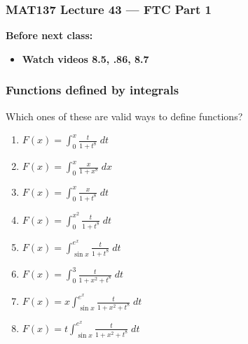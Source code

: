 \documentclass[14pt]{beamer}
\newcommand{\setsize}[1]{\fontsize{#1}{#1}\selectfont} %
\newcommand{\vv}{\vspace{.1cm}}
\begin{document}
\begin{frame}
	\frametitle{MAT137 Lecture 43 --- FTC Part 1}

	\vfill
	{\bf Before next class:}
		\begin{itemize} \normalsize
			\item {\bf Watch videos 8.5, .86, 8.7}
		\end{itemize}
\end{frame}
	\begin{frame}[t]
		\setsize{11}
		\frametitle{Functions defined by integrals}

		Which ones of these are valid ways to define functions?

		\vv

		\begin{multicols}{2}
			\begin{enumerate}
				\item ${\displaystyle F(x) = \int_0^x \frac{t}{1+ t^{8}} \; dt}$
					\vspace{.3cm}

				\item ${\displaystyle F(x) = \int_0^x \frac{x}{1+ x^{8}} \; dx}$
					\vspace{.3cm}

				\item ${\displaystyle F(x) = \int_0^x \frac{x}{1+ t^{8}} \; dt}$
					\vspace{.3cm}

				\item ${\displaystyle F(x) = \int_0^{x^2} \frac{t}{1+t^{8}} \; dt}$
					\vspace{.3cm}

				\item ${\displaystyle F(x) = \int_{\sin x}^{e^x} \frac{t}{1+t^{8}} \; dt}$
					\vspace{.3cm}

				\item ${\displaystyle F(x) = \int_0^3 \frac{t}{1+x^{2}+t^{8}} \; dt}$
					\vspace{.3cm}

				\item ${\displaystyle F(x) = x \int_{\sin x}^{e^x} \frac{t}{1+x^{2}+t^{8}} \; dt}$
					\vspace{.3cm}

				\item ${\displaystyle F(x) = t \int_{\sin x}^{e^x} \frac{t}{1+x^{2}+t^{8}} \; dt}$
					\vspace{.3cm}
			\end{enumerate}
		\end{multicols}
	\end{frame}
\end{document}
